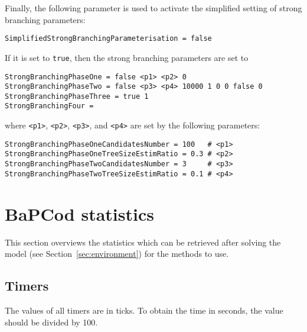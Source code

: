 \documentclass[10pt,a4paper]{article}
\newcommand{\bc}{BaPCod\xspace}
\begin{document}
Finally, the following parameter is used to activate the simplified setting of strong branching parameters:
\begin{lstlisting}
SimplifiedStrongBranchingParameterisation = false
\end{lstlisting}
If it is set to \verb+true+, then the strong branching parameters are set to
\begin{lstlisting}
StrongBranchingPhaseOne = false <p1> <p2> 0
StrongBranchingPhaseTwo = false <p3> <p4> 10000 1 0 0 false 0
StrongBranchingPhaseThree = true 1
StrongBranchingFour = 
\end{lstlisting}
where \verb+<p1>+, \verb+<p2>+, \verb+<p3>+, and \verb+<p4>+ are set by the following parameters:
\begin{lstlisting}
StrongBranchingPhaseOneCandidatesNumber = 100   # <p1>
StrongBranchingPhaseOneTreeSizeEstimRatio = 0.3 # <p2>
StrongBranchingPhaseTwoCandidatesNumber = 3     # <p3>
StrongBranchingPhaseTwoTreeSizeEstimRatio = 0.1 # <p4>
\end{lstlisting}


\section{\bc statistics}
\label{sec:stats}

This section overviews the statistics which can be retrieved after solving the model (see Section~\ref{sec:environment})
for the methods to use.

\subsection{Timers}

The values of all timers are in ticks. To obtain the time in seconds, the value should be divided by 100.
\end{document}
